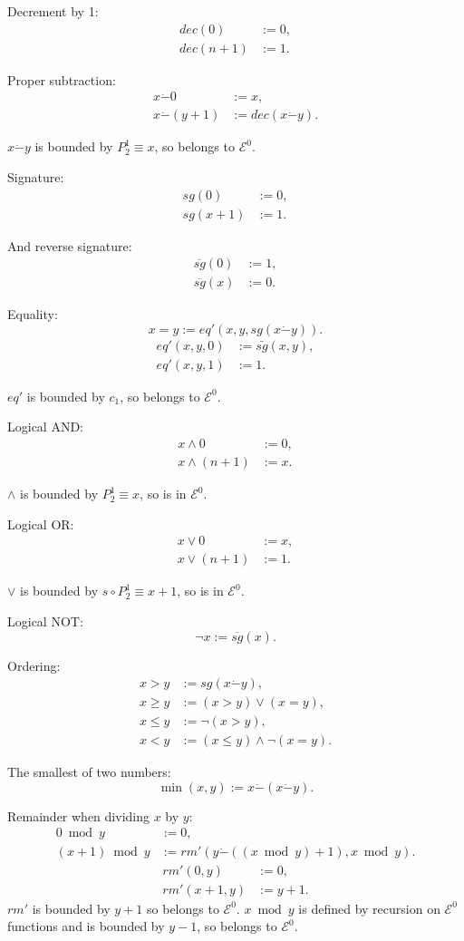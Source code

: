 \documentclass[a4paper]{article}
\newcommand{\grz}[1]{$\mathcal{E}^{#1}$}	%
\newcommand{\psub}{\dot -}	%
\newcommand{\rsg}{\overline{sg}} %
\newcommand{\recur}[1]{\begin{equation} \begin{split} #1 \end{split} \end{equation}}	%
\newcommand{\recurN}[1]{\begin{equation*} \begin{split} #1 \end{split} \end{equation*}}	%
\theoremstyle{plain}
\theoremstyle{definition}
\begin{document}
Decrement by 1:
\recur{
	dec(0) &:= 0, \\
	dec(n+1) &:= 1.
}

Proper subtraction:
\recur{
	x \psub 0 &:= x, \\
	x \psub (y+1) &:= dec(x \psub y).
}

$x \psub y$ is bounded by $P_2^1 \equiv x$, so belongs to \grz{0}.

Signature:
\recur{
	sg(0) &:= 0, 	\\
	sg(x+1) &:= 1.
}

And reverse signature:
\recur{
	\rsg(0) &:= 1, \\
	\rsg(x) &:= 0.
}

Equality:
\begin{equation}	x = y := eq'(x,y,sg(x \psub y)). \end{equation}
\recurN{
	eq'(x,y,0) &:= \bar{sg}(x,y), \\
	eq'(x,y,1) &:= 1.
}

$eq'$ is bounded by $c_1$, so belongs to \grz{0}.

Logical AND:
\recur{
	x \wedge 0 &:= 0,	 \\
	x \wedge (n+1) &:= x.
}

$\wedge$ is bounded by $P_2^1 \equiv x$, so is in \grz{0}.

Logical OR:
\recur{
	x \vee 0 &:= x, 		\\
	x \vee (n+1) &:= 1.
}

$\vee$ is bounded by $s \circ P_2^1 \equiv x+1$, so is in \grz{0}.

Logical NOT:
\begin{equation} \neg x := \rsg(x). \end{equation}

Ordering:
\begin{equation} \begin{split} 
	x>y &:= sg(x \psub y), 	\\
	x \geq y &:= (x > y) \vee (x=y),	\\
	x \leq y &:= \neg (x>y),	\\
	x < y &:= (x \leq y) \wedge \neg (x=y).
\end{split}\end{equation} 


The smallest of two numbers:
\begin{equation} \min(x,y) := x \psub ( x \psub y). \end{equation}

Remainder when dividing $x$ by $y$:
\recur{
	0 \bmod{y} &:= 0,	\\
	(x+1) \bmod{y} &:= rm' \left( y \psub \left( (x \bmod{y}) + 1 \right), x \bmod{y} \right).
	}
\recurN{
	rm'(0,y) &:= 0, 	\\
	rm'(x+1,y) &:= y+1.
}
$rm'$ is bounded by $y+1$ so belongs to \grz{0}. $x \bmod{y}$ is defined by recursion on \grz{0} functions and is bounded by $y-1$, so belongs to \grz{0}.
\end{document}
